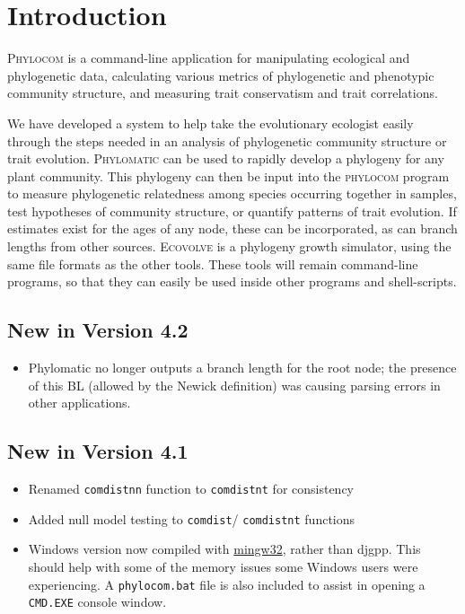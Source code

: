 \documentclass[12pt,letterpaper]{article}
\begin{document}
\tableofcontents %

\newpage

\section{Introduction}

{\scshape Phylocom} is a command-line application for manipulating
ecological and phylogenetic data, calculating various metrics of
phylogenetic and phenotypic community structure, and measuring trait
conservatism and trait correlations.

We have developed a system to help take the evolutionary ecologist
easily through the steps needed in an analysis of phylogenetic
community structure or trait evolution. {\scshape Phylomatic} can be used
to rapidly develop a phylogeny for any plant community.  This
phylogeny can then be input into the {\scshape phylocom} program to measure
phylogenetic relatedness among species occurring together in samples,
test hypotheses of community structure, or quantify patterns of trait
evolution. If estimates exist for the ages of any node, these can be
incorporated, as can branch lengths from other sources. {\scshape Ecovolve}
is a phylogeny growth simulator, using the same file formats as the
other tools. These tools will remain command-line programs, so
that they can easily be used inside other programs and shell-scripts.

\subsection{New in Version 4.2}
\begin{itemize}
 \item Phylomatic no longer outputs a branch length for the root node;
   the presence of this BL (allowed by the Newick definition) was
   causing parsing errors in other applications.
\end{itemize}

\subsection{New in Version 4.1}
\begin{itemize}
 \item Renamed \verb|comdistnn| function to \verb|comdistnt| for
   consistency
 \item Added null model testing to \verb|comdist|/ \verb|comdistnt|
   functions
 \item Windows version now compiled with \href{http://www.mingw.org/}{\sc
   mingw32}, rather than {\sc djgpp}.  This
   should help with some of the memory issues some Windows
   users were experiencing.  A \verb|phylocom.bat| file is also
   included to assist in opening a \verb|CMD.EXE| console window. 
\end{itemize}
\end{document}
